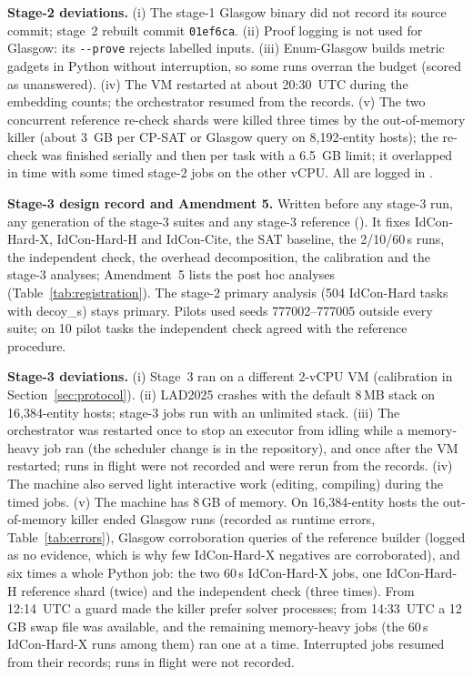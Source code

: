 \textbf{Stage-2 deviations.} (i) The stage-1 Glasgow binary did not record its source commit; stage~2 rebuilt commit \texttt{01ef6ca}. (ii) Proof logging is not used for Glasgow: its \texttt{-{}-prove} rejects labelled inputs. (iii) Enum-Glasgow builds metric gadgets in Python without interruption, so some runs overran the budget (scored as unanswered). (iv) The VM restarted at about 20:30~UTC during the embedding counts; the orchestrator resumed from the records. (v) The two concurrent reference re-check shards were killed three times by the out-of-memory killer (about 3~GB per CP-SAT or Glasgow query on 8,192-entity hosts); the re-check was finished serially and then per task with a 6.5~GB limit; it overlapped in time with some timed stage-2 jobs on the other vCPU. All are logged in .

\textbf{Stage-3 design record and Amendment 5.} Written before any stage-3 run, any generation of the stage-3 suites and any stage-3 reference (). It fixes IdCon-Hard-X, IdCon-Hard-H and IdCon-Cite, the SAT baseline, the 2/10/60\,s runs, the independent check, the overhead decomposition, the calibration and the stage-3 analyses; Amendment~5 lists the post hoc analyses (Table~\ref{tab:registration}). The stage-2 primary analysis (504 IdCon-Hard tasks with \textsf{decoy\_s}) stays primary. Pilots used seeds 777002--777005 outside every suite; on 10 pilot tasks the independent check agreed with the reference procedure.

\textbf{Stage-3 deviations.} (i) Stage~3 ran on a different 2-vCPU VM (calibration in Section~\ref{sec:protocol}). (ii) LAD2025 crashes with the default 8\,MB stack on 16,384-entity hosts; stage-3 jobs run with an unlimited stack. (iii) The orchestrator was restarted once to stop an executor from idling while a memory-heavy job ran (the scheduler change is in the repository), and once after the VM restarted; runs in flight were not recorded and were rerun from the records. (iv) The machine also served light interactive work (editing, compiling) during the timed jobs. (v) The machine has 8\,GB of memory. On 16,384-entity hosts the out-of-memory killer ended Glasgow runs (recorded as runtime errors, Table~\ref{tab:errors}), Glasgow corroboration queries of the reference builder (logged as no evidence, which is why few IdCon-Hard-X negatives are corroborated), and six times a whole Python job: the two 60\,s IdCon-Hard-X jobs, one IdCon-Hard-H reference shard (twice) and the independent check (three times). From 12:14~UTC a guard made the killer prefer solver processes; from 14:33~UTC a 12\,GB swap file was available, and the remaining memory-heavy jobs (the 60\,s IdCon-Hard-X runs among them) ran one at a time. Interrupted jobs resumed from their records; runs in flight were not recorded.

